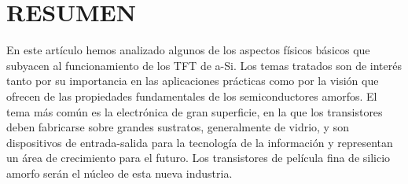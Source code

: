 \documentclass[conference]{IEEEtran}
\begin{document}
\section{RESUMEN}
    En este artículo hemos analizado algunos de los aspectos físicos básicos que subyacen al funcionamiento 
    de los TFT de a-Si. Los temas tratados son de interés tanto por su importancia en las aplicaciones 
    prácticas como por la visión que ofrecen de las propiedades fundamentales de los semiconductores amorfos. 
    El tema más común es la electrónica de gran superficie, en la que los transistores deben fabricarse 
    sobre grandes sustratos, generalmente de vidrio, y son dispositivos de entrada-salida para la 
    tecnología de la información y representan un área de crecimiento para el futuro. Los transistores de 
    película fina de silicio amorfo serán el núcleo de esta nueva industria.
\end{document}

